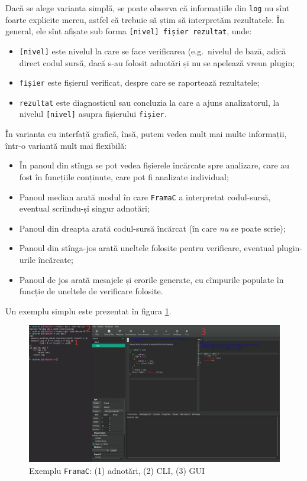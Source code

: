 Dacă se alege varianta simplă, se poate observa că informațiile din \texttt{log}
nu sînt foarte explicite mereu, astfel că trebuie să știm să interpretăm rezultatele.
În general, ele sînt afișate sub forma \texttt{[nivel] fișier rezultat}, unde:
\begin{itemize}
\item \texttt{[nivel]} este nivelul la care se face verificarea (e.g.\ nivelul de bază, adică
  direct codul sursă, dacă s-au folosit adnotări și nu se apelează vreun plugin;
\item \texttt{fișier} este fișierul verificat, despre care se raportează rezultatele;
\item \texttt{rezultat} este diagnosticul sau concluzia la care a ajuns analizatorul,
  la nivelul \texttt{[nivel]} asupra fișierului \texttt{fișier}.
\end{itemize}

În varianta cu interfață grafică, însă, putem vedea mult mai multe informații, într-o
variantă mult mai flexibilă:
\begin{itemize}
\item În panoul din stînga se pot vedea fișierele încărcate spre analizare, care au fost
   în funcțiile conținute, care pot fi analizate individual;
\item Panoul median arată modul în care \texttt{FramaC} a interpretat codul-sursă,
  eventual scriindu-și singur adnotări;
\item Panoul din dreapta arată codul-sursă încărcat (în care \emph{nu} se poate scrie);
\item Panoul din stînga-jos arată uneltele folosite pentru verificare, eventual
  plugin-urile încărcate;
\item Panoul de jos arată mesajele și erorile generate, cu cîmpurile populate în
  funcție de uneltele de verificare folosite.
\end{itemize}

Un exemplu simplu este prezentat în figura \ref{fig:exframa}.

\begin{figure}[!htbp]
  \centering
  \includegraphics[width=1\textwidth]{img/exemplu}
  \caption{Exemplu \texttt{FramaC}: (1) adnotări, (2) CLI, (3) GUI}
  \label{fig:exframa}
\end{figure}

